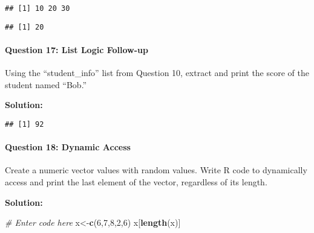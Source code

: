\documentclass[
]{article}
\newenvironment{Shaded}{\begin{snugshade}}{\end{snugshade}}
\newcommand{\CommentTok}[1]{\textcolor[rgb]{0.56,0.35,0.01}{\textit{#1}}}
\newcommand{\DecValTok}[1]{\textcolor[rgb]{0.00,0.00,0.81}{#1}}
\newcommand{\FunctionTok}[1]{\textcolor[rgb]{0.13,0.29,0.53}{\textbf{#1}}}
\newcommand{\NormalTok}[1]{#1}
\newcommand{\OtherTok}[1]{\textcolor[rgb]{0.56,0.35,0.01}{#1}}
\newcommand{\SpecialCharTok}[1]{\textcolor[rgb]{0.81,0.36,0.00}{\textbf{#1}}}
\newcommand{\StringTok}[1]{\textcolor[rgb]{0.31,0.60,0.02}{#1}}
\begin{document}
\begin{verbatim}
## [1] 10 20 30
\end{verbatim}

\begin{Shaded}
\end{Shaded}

\begin{verbatim}
## [1] 20
\end{verbatim}

\hypertarget{question-17-list-logic-follow-up}{%
\paragraph{Question 17: List Logic
Follow-up}\label{question-17-list-logic-follow-up}}

Using the ``student\_info'' list from Question 10, extract and print the
score of the student named ``Bob.''

\textbf{Solution:}

\begin{Shaded}
\end{Shaded}

\begin{verbatim}
## [1] 92
\end{verbatim}

\hypertarget{question-18-dynamic-access}{%
\paragraph{Question 18: Dynamic
Access}\label{question-18-dynamic-access}}

Create a numeric vector values with random values. Write R code to
dynamically access and print the last element of the vector, regardless
of its length.

\textbf{Solution:}

\begin{Shaded}
\begin{Highlighting}[]
\CommentTok{\# Enter code here}
\NormalTok{x}\OtherTok{\textless{}{-}}\FunctionTok{c}\NormalTok{(}\DecValTok{6}\NormalTok{,}\DecValTok{7}\NormalTok{,}\DecValTok{8}\NormalTok{,}\DecValTok{2}\NormalTok{,}\DecValTok{6}\NormalTok{)}
\NormalTok{x[}\FunctionTok{length}\NormalTok{(x)]}
\end{Highlighting}
\end{Shaded}
\end{document}
